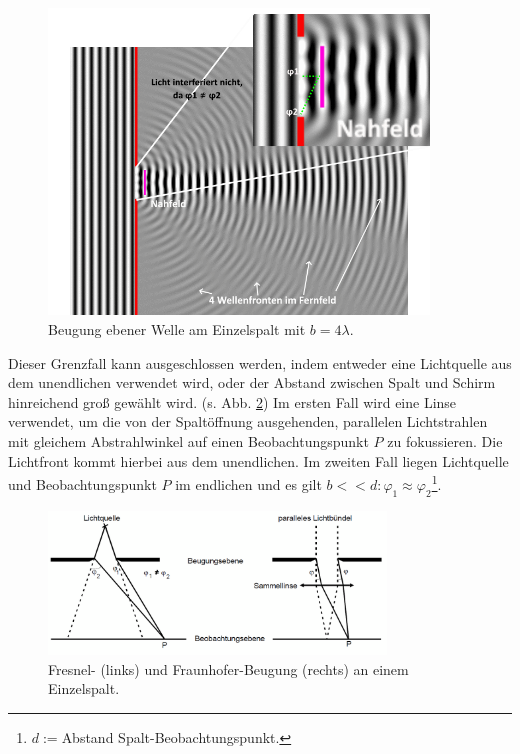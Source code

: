 \begin{figure}
    \centering
    \includegraphics[width=0.9\textwidth]{plots/Wave_Diffraction_4Lambda_Slit.png}
    \caption{Beugung ebener Welle am Einzelspalt mit $b = 4\lambda$.\protect\footnotemark}        %
    \label{fig:waveDiff}
\end{figure}

Dieser Grenzfall kann ausgeschlossen werden, indem entweder eine Lichtquelle aus dem unendlichen verwendet wird, oder der Abstand zwischen Spalt und Schirm hinreichend groß gewählt wird. (s. Abb. \ref{fig:fresnelFraunhofer})
Im ersten Fall wird eine Linse verwendet, um die von der Spaltöffnung ausgehenden, parallelen Lichtstrahlen mit gleichem Abstrahlwinkel auf einen Beobachtungspunkt $P$ zu fokussieren. Die Lichtfront kommt hierbei aus dem unendlichen.
Im zweiten Fall liegen Lichtquelle und Beobachtungspunkt $P$ im endlichen und es gilt $b << d : \varphi_1 \approx \varphi_2$\footnote{$d := $Abstand Spalt-Beobachtungspunkt.}.

\begin{figure}
    \centering
    \includegraphics[width=0.8\textwidth]{plots/Fresnel_Fraunhofer.png}
    \caption{Fresnel- (links) und Fraunhofer-Beugung (rechts) an einem Einzelspalt.}
    \label{fig:fresnelFraunhofer}
\end{figure}

